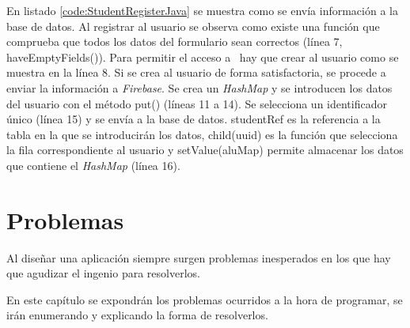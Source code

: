 		\bigskip
		En listado \ref{code:StudentRegisterJava} se muestra como se envía información a la base de datos. Al registrar al usuario se observa como existe una función que comprueba que todos los datos del formulario sean correctos (línea 7, {\ttfamily haveEmptyFields()}). Para permitir el acceso a \CollegeApp\ hay que crear al usuario como se muestra en la línea 8. Si se crea al usuario de forma satisfactoria, se procede a enviar la información a {\it Firebase}. Se crea un {\it HashMap} y se introducen los datos del usuario con el método {\ttfamily put()} (líneas 11 a 14). Se selecciona un identificador único (línea 15) y se envía a la base de datos. {\ttfamily studentRef} es la referencia a la tabla en la que se introducirán los datos, {\ttfamily child(uuid)} es la función que selecciona la fila correspondiente al usuario y {\ttfamily setValue(aluMap)} permite almacenar los datos que contiene el {\it HashMap} (línea 16).
		
		
	
	\section{Problemas}
		Al diseñar una aplicación siempre surgen problemas inesperados en los que hay que agudizar el ingenio para resolverlos.
		
		En este capítulo se expondrán los problemas ocurridos a la hora de programar, se irán enumerando y explicando la forma de resolverlos.
		
